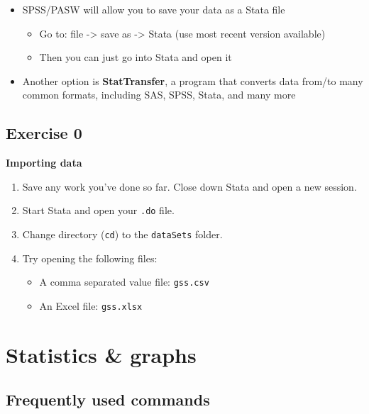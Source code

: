 \documentclass[
]{book}
\providecommand{\tightlist}{%
  \setlength{\itemsep}{0pt}\setlength{\parskip}{0pt}}
\begin{document}
\begin{itemize}
\tightlist
\item
  SPSS/PASW will allow you to save your data as a Stata file

  \begin{itemize}
  \tightlist
  \item
    Go to: file -\textgreater{} save as -\textgreater{} Stata (use most recent version available)
  \item
    Then you can just go into Stata and open it
  \end{itemize}
\item
  Another option is \textbf{StatTransfer}, a program that converts data from/to many common formats, including SAS, SPSS, Stata, and many more
\end{itemize}

\hypertarget{exercise-0-5}{%
\subsection{Exercise 0}\label{exercise-0-5}}

\textbf{Importing data}

\begin{enumerate}
\def\labelenumi{\arabic{enumi}.}
\tightlist
\item
  Save any work you've done so far. Close down Stata and open a new session.
\item
  Start Stata and open your \texttt{.do} file.
\item
  Change directory (\texttt{cd}) to the \texttt{dataSets} folder.
\item
  Try opening the following files:

  \begin{itemize}
  \tightlist
  \item
    A comma separated value file: \texttt{gss.csv}
  \item
    An Excel file: \texttt{gss.xlsx}
  \end{itemize}
\end{enumerate}

\hypertarget{statistics-graphs}{%
\section{Statistics \& graphs}\label{statistics-graphs}}

\hypertarget{frequently-used-commands}{%
\subsection{Frequently used commands}\label{frequently-used-commands}}
\end{document}
